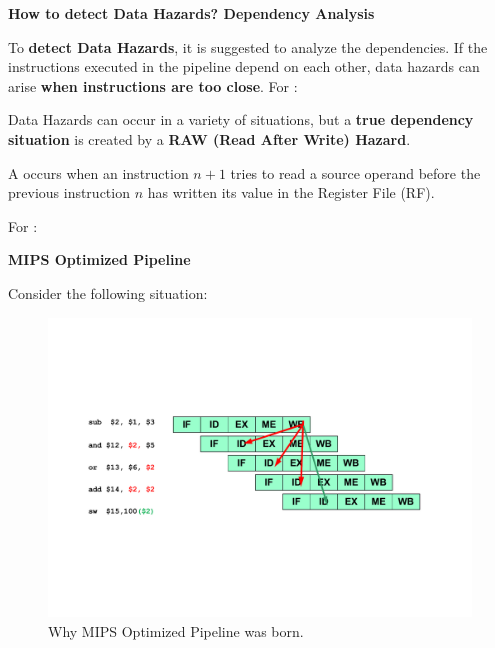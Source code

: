 \begin{flushleft}
    \textcolor{Green3}{ \textbf{How to detect Data Hazards? Dependency Analysis}}
\end{flushleft}
To \textbf{detect Data Hazards}, it is suggested to analyze the dependencies. If the instructions executed in the pipeline depend on each other, data hazards can arise \textbf{when instructions are too close}. For :

Data Hazards can occur in a variety of situations, but a \textbf{true dependency situation} is created by a \textbf{RAW (Read After Write) Hazard}.

\begin{definitionbox}
    A  occurs when an instruction $n+1$ tries to read a source operand before the previous instruction $n$ has written its value in the Register File (RF).
\end{definitionbox}

\noindent
For :


\begin{center}
    \large
    \textcolor{Red3}{\textbf{MIPS Optimized Pipeline}}
\end{center}
Consider the following situation:
\begin{figure}[!htp]
    \centering
    \includegraphics[width=\textwidth]{img/RAW-hazards-1.pdf}
    \caption{Why MIPS Optimized Pipeline was born.\cite{pipelining-slides}}
\end{figure}

